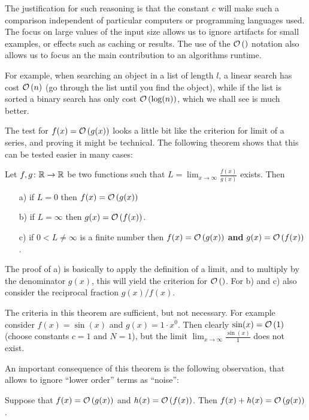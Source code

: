 The justification for such reasoning is that the constant $c$ will make such
a comparison independent of particular computers or programming
languages used. The focus on large values of the input size allows us to
ignore artifacts for small examples, or effects such as caching or results.
The use of the ${\mathcal O}\/\left(\right)$ notation also allows us to focus an the main
contribution to an algorithms runtime.

For example, when searching an object in a list of length $l$, a linear
search has cost ${\mathcal O}\/\left(n\right)$ (go through the list until you find the object),
while if the list is sorted a binary search has only cost ${\mathcal O}\/\left(\log(n)\right)$,
which we shall see is much better.
\medskip

The test for $f(x)={\mathcal O}\/\left(g(x)\right)$ looks a little bit like the criterion for
limit of a series, and proving it might be technical. The following theorem
shows that this can be tested easier in many cases:
\begin{thm}
\label{thmgo}
Let $f,g\colon{\mathbb R}\to{\mathbb R}$ be two functions such that
$L=\displaystyle \lim_{x\to\infty}\frac{f(x)}{g(x)}$ exists. Then
\begin{itemize}
\item[a)] if $L=0$ then $f(x)={\mathcal O}\/\left(g(x)\right)$
\item[b)] if $L=\infty$ then $g(x)={\mathcal O}\/\left(f(x)\right)$.
\item[c)] if $0<L\not=\infty$ is a finite number then
$f(x)={\mathcal O}\/\left(g(x)\right)$ \textbf{and} $g(x)={\mathcal O}\/\left(f(x)\right)$.
\end{itemize}
\end{thm}
The proof of a) is basically to apply the definition of a limit, and to multiply
by the denominator $g(x)$, this will yield the criterion for ${\mathcal O}\/\left(\right)$. For
b) and c) also consider the reciprocal fraction $g(x)/f(x)$.
\begin{note}
The criteria in this theorem are sufficient, but not necessary. For example
consider $f(x)=\sin(x)$ and $g(x)=1\cdot x^0$. Then clearly
$\sin(x)={\mathcal O}\/\left(1\right)$ (choose constants $c=1$ and $N=1$), but the limit
$\displaystyle \lim_{x\to\infty}\frac{\sin(x)}{1}$ does not exist.
\end{note}

An important consequence of this theorem is the following observation, that
allows to ignore ``lower order'' terms as ``noise'':

Suppose that $f(x)={\mathcal O}\/\left(g(x)\right)$ and $h(x)={\mathcal O}\/\left(f(x)\right)$. Then
$f(x)+h(x)={\mathcal O}\/\left(g(x)\right)$.

